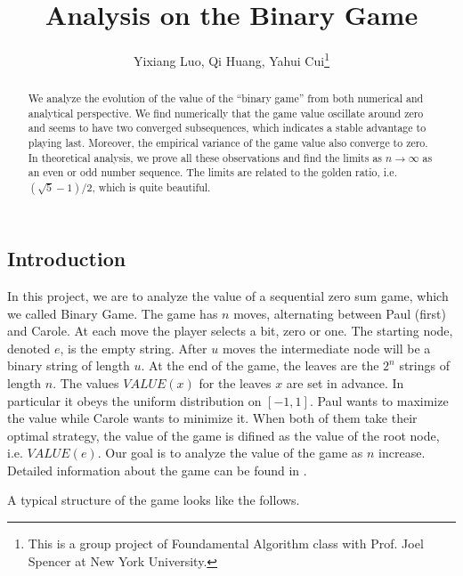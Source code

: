 \documentclass[a4paper,english]{article}
\title{Analysis on the Binary Game}
\date{}
\author{Yixiang Luo, Qi Huang, Yahui Cui\footnote{This is a group project of Foundamental Algorithm class with Prof. Joel Spencer at New York University.}}
\begin{document}
\maketitle
\begin{spacing}{1.4}


\begin{abstract}
We analyze the evolution of the value of the ``binary game'' from both numerical and analytical perspective. We find numerically that the game value oscillate around zero and seems to have two converged subsequences, which indicates a stable advantage to playing last. Moreover, the empirical variance of the game value also converge to zero. In theoretical analysis, we prove all these observations and find the limits as $n \to \infty$ as an even or odd number sequence. The limits are related to the golden ratio, i.e. $(\sqrt{5}-1)/2$, which is quite beautiful.
\end{abstract}

\section{Introduction}
In this project, we are to analyze the value of a sequential zero sum game, which we called Binary Game. The game has $n$ moves, alternating between Paul (first) and Carole. At each move the player selects a bit, zero or one. The starting node, denoted $e$, is the empty string. After $u$ moves the intermediate node will be a binary string of length $u$. At the end of the game, the leaves are the $2^n$ strings of length $n$. The values $VALUE(x)$ for the leaves $x$ are set in advance. In particular it obeys the uniform distribution on $[-1,1]$. Paul wants to maximize the value while Carole wants to minimize it. When both of them take their optimal strategy, the value of the game is difined as the value of the root node, i.e. $VALUE(e)$. Our goal is to analyze the value of the game as $n$ increase. Detailed information about the game can be found in \cite{SpencerGame}.

A typical structure of the game looks like the follows.
\begin{center}
\end{center}


\end{spacing}
\end{document}
